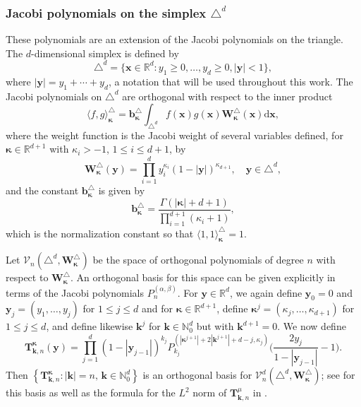 \documentclass{amsart}
\theoremstyle{remark}
\def\la{{\langle}}
\def\ra{{\rangle}}
\def\d{\mathrm{d}}
\def\a{{\alpha}}
\def\b{{\beta}}
\def\k{{\kappa}}
\def\la{{\langle}}
\def\ra{{\rangle}}
\def\kb{{\bm k}}
\def\CV{{\mathcal V}}
\def\NN{{\mathbb N}}
\def\RR{{\mathbb R}}
\def\bk{{\boldsymbol{\kappa}}}
\begin{document}
\subsubsection{Jacobi polynomials on the simplex $\triangle^d$}
These polynomials are an extension of the Jacobi polynomials on the triangle. The $d$-dimensional simplex 
is defined by 
$$
  \triangle^d = \{\bm x \in \RR^d: y_1 \ge 0, \ldots, y_d \ge 0, |\bm y| <1\}, 
$$
where $|\bm y| = y_1+\cdots + y_d$, a notation that will be used throughout this work. The Jacobi polynomials on
$\triangle^d$ are orthogonal with respect to the inner product 
\begin{equation}\label{eq:T-ipd}
  \la f, g\ra_\bk^\triangle = \bm b_\bk^\triangle \int_{\triangle^d} f(\bm x) g(\bm x) \bm W_\bk^\triangle (\bm x) \d  \bm x,
\end{equation}
where the weight function is the Jacobi weight of several variables defined, for $\bk \in \RR^{d+1}$
with $\k_i > -1$, $1 \le i \le d+1$, by 
\begin{equation}\label{eq:W_simplex}
\bm W_\bk^\triangle(\bm y) = \prod_{i=1}^d y_i^{\k_i} (1-|\bm y|)^{\k_{d+1}}, \quad \bm y \in \triangle^{d},
\end{equation}
and the constant $\bm b_\bk^\triangle$ is given by
\begin{equation}\label{eq:bT}
  \bm b_\bk^\triangle =  \frac{\Gamma(|\bk| + d+1)}{\prod_{i=1}^{d+1} (\k_i+1)},
\end{equation}
which is the normalization constant so that $\la 1,1 \ra_{\bk}^\triangle =1$. 

Let $\CV_n\left(\triangle^d, \bm W_\bk^\triangle\right)$ be the space of orthogonal polynomials of degree $n$ 
with respect to $\bm W^\triangle_\bk$. An orthogonal basis for this space can be given explicitly in terms of the 
Jacobi polynomials $P_n^{(\a,\b)}$. For $\bm y \in \RR^d$, we again define $\bm y_0 =0$ and 
$\bm y_j = (y_1,\ldots, y_j)$ for $1 \le j \le d$ and for $\bk \in \RR^{d+1}$, define $\bk^j = (\k_j, \ldots, \k_{d+1})$ 
for $1 \le j \le d$, and define likewise $\kb^j$ for $\kb \in \NN_0^d$ but with $\kb^{d+1} =0$. 
We now define 
\begin{equation}\label{eq:OP_TT}
 \bm T_{\kb, n}^\bk(\bm y) = \prod_{j=1}^d \left( 1-|\bm y_{j-1}| \right)^{k_j} 
     P_{k_j}^{(|\bk^{j+1}| +2 |\kb^{j+1}| + d - j, \k_j)} \bigg(\frac{2 y_j}{1-| \bm y_{j-1}|}-1\bigg).
\end{equation}
Then $\left \{ \bm T_{\kb, n}^\bk: |\kb| =n, \, \kb \in \NN_0^d\right\}$ is an orthogonal basis for 
$\CV_n^d(\triangle^d, \bm W_\bk^\triangle)$; see \cite[p. 150]{DX} for this basis as well as the 
formula for the $L^2$ norm of $\bm T_{\kb, n}^\mu$ in \cite[p. 151]{DX}. 
 
\end{document}
